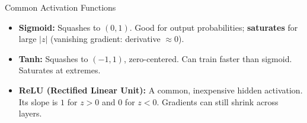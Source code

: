 \begin{frame}{Common Activation Functions}
\begin{center}
    \end{center}
    \vspace{-0.9em}
    \small
    \begin{itemize}
        \item \textbf{Sigmoid:} Squashes to $(0, 1)$. Good for output probabilities; \textbf{saturates} for large $|z|$ (vanishing gradient: derivative $\approx 0$).
        \item \textbf{Tanh:} Squashes to $(-1, 1)$, zero-centered. Can train faster than sigmoid. Saturates at extremes.
        \item \textbf{ReLU (Rectified Linear Unit):} A common, inexpensive hidden activation. Its slope is $1$ for $z>0$ and $0$ for $z<0$. Gradients can still shrink across layers.
    \end{itemize}
\end{frame}

